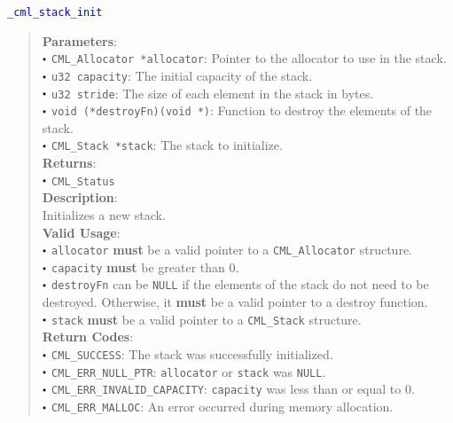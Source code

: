 \documentclass[a4paper,oneside,10pt]{article}
\newcommand{\function}[1]{
  \noindent\textcolor{blue}{\texttt{#1}}
  \vspace{-0.3em}
}
\renewcommand{\dot}{\raisebox{0.3ex}{\scalebox{0.6}{$\bullet$}}}
\theoremstyle{definition}
\begin{document}
\function{\_cml\_stack\_init}
\begin{quote}
  \textbf{Parameters}: \\
  $\dot$ \texttt{CML\_Allocator *allocator}: Pointer to the allocator to use in the stack. \\
  $\dot$ \texttt{u32 capacity}: The initial capacity of the stack. \\
  $\dot$ \texttt{u32 stride}: The size of each element in the stack in bytes. \\
  $\dot$ \texttt{void (*destroyFn)(void *)}: Function to destroy the elements of the stack. \\
  $\dot$ \texttt{CML\_Stack *stack}: The stack to initialize. \\
  \textbf{Returns}: \\
  $\dot$ \texttt{CML\_Status} \\
  
  \vspace{-0.75em}
  \textbf{Description}: \\
  Initializes a new stack. \\

  \vspace{-0.75em}
  \textbf{Valid Usage}: \\
  $\dot$ \texttt{allocator} \textbf{must} be a valid pointer to a \texttt{CML\_Allocator} structure. \\
  $\dot$ \texttt{capacity} \textbf{must} be greater than 0. \\
  $\dot$ \texttt{destroyFn} can be \texttt{NULL} if the elements of the stack do not need to be destroyed. Otherwise, it \textbf{must} be a valid pointer to a destroy function. \\
  $\dot$ \texttt{stack} \textbf{must} be a valid pointer to a \texttt{CML\_Stack} structure. \\

  \vspace{-0.75em}
  \textbf{Return Codes}: \\
  $\dot$ \texttt{CML\_SUCCESS}: The stack was successfully initialized. \\
  $\dot$ \texttt{CML\_ERR\_NULL\_PTR}: \texttt{allocator} or \texttt{stack} was \texttt{NULL}. \\
  $\dot$ \texttt{CML\_ERR\_INVALID\_CAPACITY}: \texttt{capacity} was less than or equal to 0. \\
  $\dot$ \texttt{CML\_ERR\_MALLOC}: An error occurred during memory allocation. \\
\end{quote}
\end{document}

